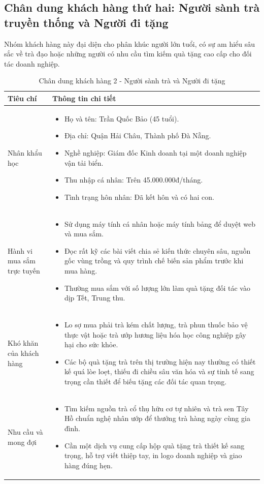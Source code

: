 \subsection{Chân dung khách hàng thứ hai: Người sành trà truyền thống và Người đi tặng}
Nhóm khách hàng này đại diện cho phân khúc người lớn tuổi, có sự am hiểu sâu sắc về trà đạo hoặc những người có nhu cầu tìm kiếm quà tặng cao cấp cho đối tác doanh nghiệp.

\begin{table}[H]
\centering
\caption{Chân dung khách hàng 2 - Người sành trà và Người đi tặng}
\label{tab:persona2}
\begin{tabular}{p{3.5cm}p{11.5cm}}
\toprule
\textbf{Tiêu chí} & \textbf{Thông tin chi tiết} \\ \midrule
Nhân khẩu học & 
\begin{itemize}
    \item Họ và tên: Trần Quốc Bảo (45 tuổi).
    \item Địa chỉ: Quận Hải Châu, Thành phố Đà Nẵng.
    \item Nghề nghiệp: Giám đốc Kinh doanh tại một doanh nghiệp vận tải biển.
    \item Thu nhập cá nhân: Trên 45.000.000đ/tháng.
    \item Tình trạng hôn nhân: Đã kết hôn và có hai con.
\end{itemize} \\ \addlinespace
Hành vi mua sắm trực tuyến & 
\begin{itemize}
    \item Sử dụng máy tính cá nhân hoặc máy tính bảng để duyệt web và mua sắm.
    \item Đọc rất kỹ các bài viết chia sẻ kiến thức chuyên sâu, nguồn gốc vùng trồng và quy trình chế biến sản phẩm trước khi mua hàng.
    \item Thường mua sắm với số lượng lớn làm quà tặng đối tác vào dịp Tết, Trung thu.
\end{itemize} \\ \addlinespace
Khó khăn của khách hàng & 
\begin{itemize}
    \item Lo sợ mua phải trà kém chất lượng, trà phun thuốc bảo vệ thực vật hoặc trà ướp hương liệu hóa học công nghiệp gây hại cho sức khỏe.
    \item Các bộ quà tặng trà trên thị trường hiện nay thường có thiết kế quá lòe loẹt, thiếu đi chiều sâu văn hóa và sự tinh tế sang trọng cần thiết để biếu tặng các đối tác quan trọng.
\end{itemize} \\ \addlinespace
Nhu cầu và mong đợi & 
\begin{itemize}
    \item Tìm kiếm nguồn trà cổ thụ hữu cơ tự nhiên và trà sen Tây Hồ chuẩn nghệ nhân ướp để thưởng trà hàng ngày cùng gia đình.
    \item Cần một dịch vụ cung cấp hộp quà tặng trà thiết kế sang trọng, hỗ trợ viết thiệp tay, in logo doanh nghiệp và giao hàng đúng hẹn.
\end{itemize} \\ \bottomrule
\end{tabular}
\end{table}

